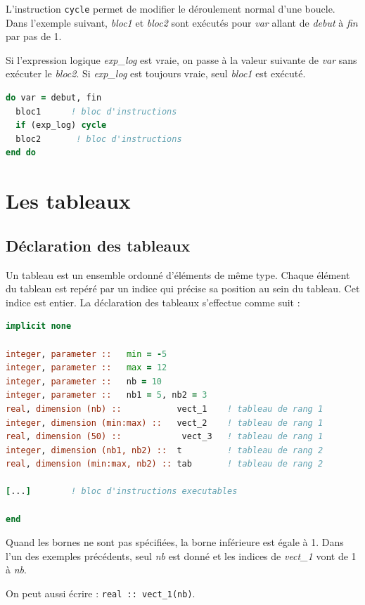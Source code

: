 \documentclass[a4paper,twoside]{article}
\begin{document}
L'instruction \texttt{cycle} permet de modifier le déroulement normal d'une boucle. Dans l'exemple suivant, \emph{bloc1} et \emph{bloc2} sont exécutés pour \emph{var} allant de \emph{debut} à \emph{fin} par pas de 1. 

Si l'expression logique \emph{exp\_log} est vraie, on passe à la valeur suivante de \emph{var} sans exécuter le \emph{bloc2}. Si \emph{exp\_log} est toujours vraie, seul \emph{bloc1} est exécuté.
\begin{lstlisting}[language=Fortran]
do var = debut, fin 
  bloc1      ! bloc d'instructions 
  if (exp_log) cycle
  bloc2       ! bloc d'instructions
end do
\end{lstlisting}

\section{Les tableaux}
\subsection{Déclaration des tableaux}
Un tableau est un ensemble ordonné d'éléments de même type. Chaque élément du tableau est repéré par un indice qui précise sa position au sein du tableau. Cet indice est entier. La déclaration des tableaux s'effectue comme suit :
\begin{lstlisting}[language=Fortran]
implicit none 
  
integer, parameter ::   min = -5       
integer, parameter ::   max = 12        
integer, parameter ::   nb = 10       
integer, parameter ::   nb1 = 5, nb2 = 3       
real, dimension (nb) ::           vect_1    ! tableau de rang 1 
integer, dimension (min:max) ::   vect_2    ! tableau de rang 1
real, dimension (50) ::            vect_3   ! tableau de rang 1
integer, dimension (nb1, nb2) ::  t         ! tableau de rang 2    
real, dimension (min:max, nb2) :: tab       ! tableau de rang 2 

[...]        ! bloc d'instructions executables
 
end
\end{lstlisting}

\begin{remarque}
Quand les bornes ne sont pas spécifiées, la borne inférieure est égale à 1. Dans l'un des exemples précédents, seul \emph{nb} est donné et les indices de \emph{vect\_1} vont de 1 à \emph{nb}. 

On peut aussi écrire : \texttt{real :: vect\_1(nb)}.
\end{remarque}
\end{document}
